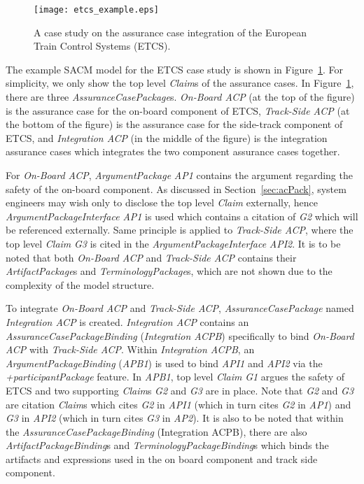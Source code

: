 \begin{figure}
	\centering
	\texttt{[image: etcs\_example.eps]}
	\caption{A case study on the assurance case integration of the European Train Control Systems (ETCS).}
	\label{fig:etcs_example}
\end{figure}

The example SACM model for the ETCS case study is shown in Figure~\ref{fig:etcs_example}. For simplicity, we only show the top level \textit{Claim}s of the assurance cases. In Figure~\ref{fig:etcs_example}, there are three \textit{AssuranceCasePackage}s. \textit{On-Board ACP} (at the top of the figure) is the assurance case for the on-board component of ETCS, \textit{Track-Side ACP} (at the bottom of the figure) is the assurance case for the side-track component of ETCS, and \textit{Integration ACP} (in the middle of the figure) is the integration assurance cases which integrates the two component assurance cases together. 

For \textit{On-Board ACP}, \textit{ArgumentPackage} \textit{AP1} contains the argument regarding the safety of the on-board component. As discussed in Section~\ref{sec:acPack}, system engineers may wish only to disclose the top level \textit{Claim} externally, hence \textit{ArgumentPackageInterface} \textit{AP1} is used which contains a citation of \textit{G2} which will be referenced externally. Same principle is applied to \textit{Track-Side ACP}, where the top level \textit{Claim} \textit{G3} is cited in the \textit{ArgumentPackageInterface} \textit{API2}. It is to be noted that both \textit{On-Board ACP} and \textit{Track-Side ACP} contains their \textit{ArtifactPackage}s and \textit{TerminologyPackage}s, which are not shown due to the complexity of the model structure. 

To integrate \textit{On-Board ACP} and \textit{Track-Side ACP}, \textit{AssuranceCasePackage} named \textit{Integration ACP} is created. \textit{Integration ACP} contains an \textit{AssuranceCasePackageBinding} (\textit{Integration ACPB}) specifically to bind \textit{On-Board ACP} with \textit{Track-Side ACP}. Within \textit{Integration ACPB}, an \textit{ArgumentPackageBinding} (\textit{APB1}) is used to bind \textit{API1} and \textit{API2} via the \textit{+participantPackage} feature. In \textit{APB1}, top level \textit{Claim} \textit{G1} argues the safety of ETCS and two supporting \textit{Claim}s \textit{G2} and \textit{G3} are in place. Note that \textit{G2} and \textit{G3} are citation \textit{Claim}s which cites \textit{G2} in \textit{API1} (which in turn cites \textit{G2} in \textit{AP1}) and \textit{G3} in \textit{API2} (which in turn cites \textit{G3} in \textit{AP2}). It is also to be noted that within the \textit{AssuranceCasePackageBinding} (Integration ACPB), there are also \textit{ArtifactPackageBinding}s and \textit{TerminologyPackageBinding}s which binds the artifacts and expressions used in the on board component and track side component. 

